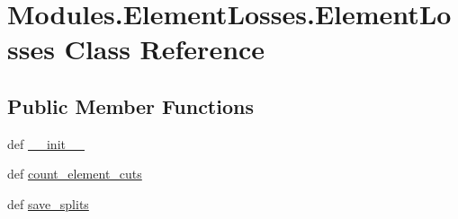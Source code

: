 \hypertarget{classModules_1_1ElementLosses_1_1ElementLosses}{\section{Modules.\-Element\-Losses.\-Element\-Losses Class Reference}
\label{classModules_1_1ElementLosses_1_1ElementLosses}
}
\subsection*{Public Member Functions}
\begin{DoxyCompactItemize}
\item 
def \hyperlink{classModules_1_1ElementLosses_1_1ElementLosses_aa19d25723c97a424378699fcaba8edce}{\-\_\-\-\_\-init\-\_\-\-\_\-}
\item 
def \hyperlink{classModules_1_1ElementLosses_1_1ElementLosses_afdf9c1017acdecea3d66b02264849a6c}{count\-\_\-element\-\_\-cuts}
\item 
def \hyperlink{classModules_1_1ElementLosses_1_1ElementLosses_a5752d0dfbab2168077fe962bb47564e8}{save\-\_\-splits}
\end{DoxyCompactItemize}

